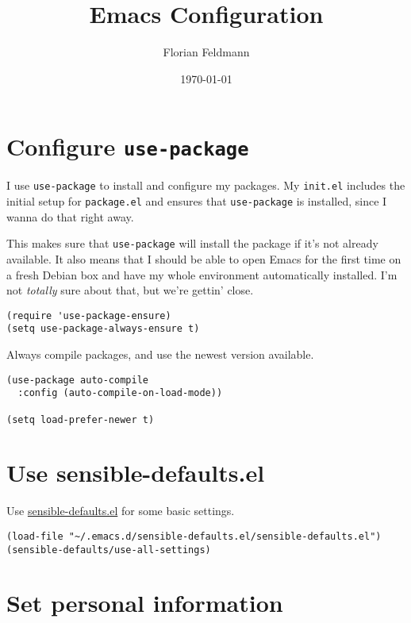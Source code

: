\documentclass{article}
\author{Florian Feldmann}
\date{\today}
\title{Emacs Configuration}
\begin{document}
\maketitle
\tableofcontents


\section{Configure \texttt{use-package}}
\label{sec:org453caf6}

I use \texttt{use-package} to install and configure my packages. My \texttt{init.el} includes
the initial setup for \texttt{package.el} and ensures that \texttt{use-package} is installed,
since I wanna do that right away.

This makes sure that \texttt{use-package} will install the package if it's not already
available. It also means that I should be able to open Emacs for the first time
on a fresh Debian box and have my whole environment automatically installed. I'm
not \emph{totally} sure about that, but we're gettin' close.

\begin{verbatim}
(require 'use-package-ensure)
(setq use-package-always-ensure t)
\end{verbatim}

Always compile packages, and use the newest version available.

\begin{verbatim}
(use-package auto-compile
  :config (auto-compile-on-load-mode))

(setq load-prefer-newer t)
\end{verbatim}

\section{Use sensible-defaults.el}
\label{sec:org29b7836}

Use \href{https://github.com/hrs/sensible-defaults.el}{sensible-defaults.el} for some basic settings.

\begin{verbatim}
(load-file "~/.emacs.d/sensible-defaults.el/sensible-defaults.el")
(sensible-defaults/use-all-settings)
\end{verbatim}

\section{Set personal information}
\label{sec:orgfa0f412}
\end{document}
